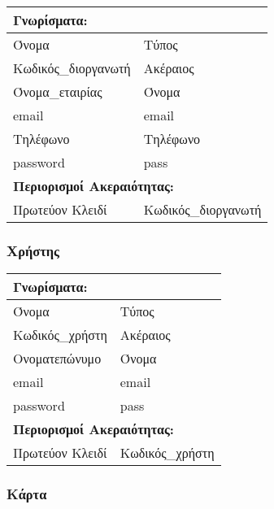 \begin{tabular}{|p{6cm}|p{8cm}|}
  \multicolumn{2}{l}{\textbf{Γνωρίσματα:}}               \\ \hline
  Όνομα               & Τύπος                            \\ \hline
  Κωδικός\_διοργανωτή & Ακέραιος                         \\ \hline
  Όνομα\_εταιρίας     & Όνομα                            \\ \hline
  email               & email                            \\ \hline
  Τηλέφωνο            & Τηλέφωνο                         \\ \hline
  password            & pass                             \\ \hline
  \multicolumn{2}{l}{\textbf{Περιορισμοί Ακεραιότητας:}} \\ \hline
  Πρωτεύον Κλειδί     & Κωδικός\_διοργανωτή              \\ \hline
\end{tabular}


\subsubsection{Χρήστης}

\begin{tabular}{|p{6cm}|p{8cm}|}
  \multicolumn{2}{l}{\textbf{Γνωρίσματα:}}               \\ \hline
  Όνομα           & Τύπος                                \\ \hline
  Κωδικός\_χρήστη & Ακέραιος                             \\ \hline
  Ονοματεπώνυμο   & Όνομα                                \\ \hline
  email           & email                                \\ \hline
  password        & pass                                 \\ \hline
  \multicolumn{2}{l}{\textbf{Περιορισμοί Ακεραιότητας:}} \\ \hline
  Πρωτεύον Κλειδί & Κωδικός\_χρήστη                      \\ \hline
\end{tabular}


\subsubsection{Κάρτα}


